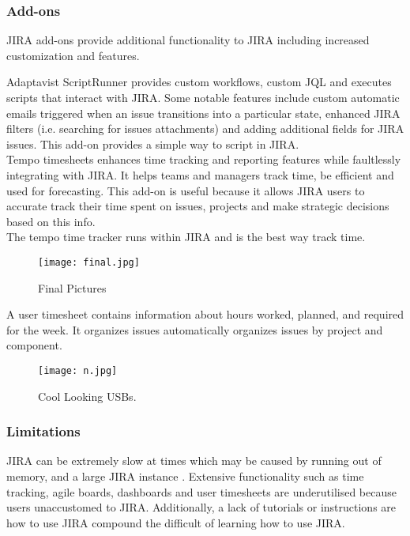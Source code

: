 \subsubsection{Add-ons}
JIRA add-ons provide additional functionality to JIRA including increased customization and features. 

Adaptavist ScriptRunner provides custom workflows, custom JQL and executes scripts that interact with JIRA. Some notable features include custom automatic emails triggered when an issue transitions into a particular state, enhanced JIRA filters (i.e. searching for issues attachments) and adding additional fields for JIRA issues. This add-on provides a simple way to script in JIRA. \\ 

\noindent Tempo timesheets enhances time tracking and reporting features while faultlessly integrating with JIRA. It helps teams and managers track time, be efficient and used for forecasting. This add-on is useful because it allows JIRA users to accurate track their time spent on issues, projects and make strategic decisions based on this info. \\
The tempo time tracker runs within JIRA and is the best way track time.

\begin{figure}
	\centering
	\texttt{[image: final.jpg]}
	\caption{Final Pictures}
\end{figure}

A user timesheet contains information about hours worked, planned, and required for the week. It organizes issues automatically organizes issues by project and component.

\begin{figure}
	\centering
	\texttt{[image: n.jpg]}
	\caption{Cool Looking USBs.}
\end{figure}

\subsubsection{Limitations}
JIRA can be extremely slow at times which may be caused by running out of memory, and a large JIRA instance \cite{issues:Online}. Extensive functionality such as time tracking, \gls{agile} boards, dashboards and user timesheets are underutilised because users unaccustomed to JIRA. Additionally, a lack of tutorials or instructions are how to use JIRA compound the difficult of learning how to use \gls{JIRA}. 

